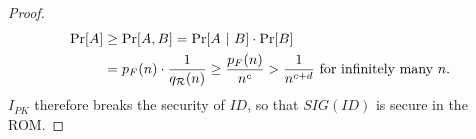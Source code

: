 \begin{proof}
\begin{align*}
\text{Pr}[A] 
& \geq \text{Pr}[A,B] = \text{Pr}[A \ | \ B] \cdot \text{Pr}[B]\\ 
& = p_F(n) \cdot \frac{1}{q_{\mathcal{R}}(n)} \geq \frac{p_F(n)}{n^c} >
\frac{1}{n^{c+d}} \text{ for infinitely many } n.
\end{align*} 
$I_{PK}$ therefore breaks the security of $ID$, so that $SIG(ID)$
is secure in the ROM.
\end{proof}

